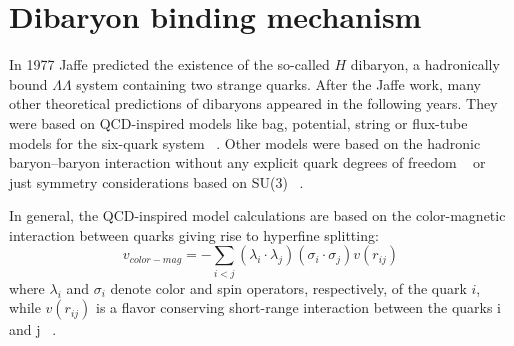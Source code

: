 %
%
\section{Dibaryon binding mechanism} \label{sec:2.1}

In 1977 Jaffe predicted the existence of the so-called $H$ dibaryon, a hadronically bound 
$\Lambda \Lambda$ system containing two strange quarks.
After the Jaffe work, many other theoretical predictions of dibaryons appeared in the following years. 
They were based on QCD-inspired models like bag, potential, string or flux-tube models for the
six-quark system ~\cite{dsinevitable,dibpred1,dibpred2,dibpred3,dibpred5,dibpred6,dibpred7,dibpred8,
dibpred9,dibpred10,dibpred11,dibpred12,dibpred13}.
Other models were based on the hadronic baryon–baryon interaction without any explicit quark degrees
of freedom ~\cite{dibpred14,dibpred15,dibpred16} or just symmetry considerations based on SU(3)
~\cite{dibpred17}.

In general, the QCD-inspired model calculations are based on the color-magnetic interaction between 
quarks giving rise to hyperfine splitting:
\begin{equation}
    v_{color-mag} = - \sum_{i<j} (\lambda_{i} \cdot \lambda_{j}) (\sigma_{i} \cdot \sigma_{j})
    v(r_{ij})
\end{equation}
where $\lambda_{i}$ and $\sigma_{i}$ denote color and spin operators, respectively, of the quark $i$, 
while $v(r_{ij})$ is a flavor conserving short-range interaction between the quarks i and j 
~\cite{colormag}.

